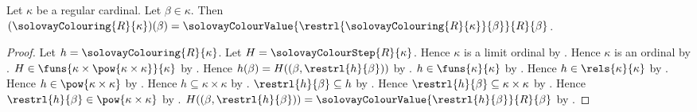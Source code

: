 \begin{theorem}\label{solovay_colouring_equation}
    Let $\kappa$ be a regular cardinal.
    Let $\beta\in\kappa$.
    Then $(\solovayColouring{R}{\kappa})(\beta)
        =\solovayColourValue
            {\restrl{\solovayColouring{R}{\kappa}}{\beta}}{R}{\beta}$.
\end{theorem}
\begin{proof}
    Let $h=\solovayColouring{R}{\kappa}$.
    Let $H=\solovayColourStep{R}{\kappa}$.
    Hence $\kappa$ is a limit ordinal
        by .
    Hence $\kappa$ is an ordinal by .
    $H\in\funs{\kappa\times\pow{\kappa\times\kappa}}{\kappa}$
        by .
    Hence $h(\beta)=H((\beta,\restrl{h}{\beta}))$
        by .
    $h\in\funs{\kappa}{\kappa}$ by .
    Hence $h\in\rels{\kappa}{\kappa}$ by .
    Hence $h\in\pow{\kappa\times\kappa}$ by .
    Hence $h\subseteq\kappa\times\kappa$ by .
    $\restrl{h}{\beta}\subseteq h$ by .
    Hence $\restrl{h}{\beta}\subseteq\kappa\times\kappa$
        by .
    Hence $\restrl{h}{\beta}\in\pow{\kappa\times\kappa}$
        by .
    $H((\beta,\restrl{h}{\beta}))
        =\solovayColourValue{\restrl{h}{\beta}}{R}{\beta}$
        by .
\end{proof}

